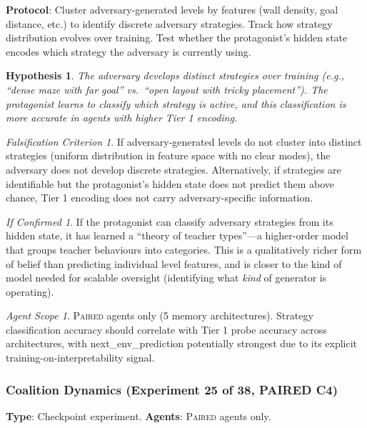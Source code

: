 \documentclass[11pt,a4paper]{article}
\newtheorem{hypothesis}{Hypothesis}[subsection]
\theoremstyle{remark}
\newtheorem*{falsification}{Falsification Criterion}
\newtheorem*{implication}{If Confirmed}
\newtheorem*{agentscope}{Agent Scope}
\newcommand{\paired}{\textsc{Paired}}
\begin{document}
\textbf{Protocol}: Cluster adversary-generated levels by features (wall density, goal distance, etc.) to identify discrete adversary strategies. Track how strategy distribution evolves over training. Test whether the protagonist's hidden state encodes which strategy the adversary is currently using.

\begin{hypothesis}
The adversary develops distinct strategies over training (e.g., ``dense maze with far goal'' vs.\ ``open layout with tricky placement''). The protagonist learns to classify which strategy is active, and this classification is more accurate in agents with higher Tier 1 encoding.
\end{hypothesis}

\begin{falsification}
If adversary-generated levels do not cluster into distinct strategies (uniform distribution in feature space with no clear modes), the adversary does not develop discrete strategies. Alternatively, if strategies are identifiable but the protagonist's hidden state does not predict them above chance, Tier 1 encoding does not carry adversary-specific information.
\end{falsification}

\begin{implication}
If the protagonist can classify adversary strategies from its hidden state, it has learned a ``theory of teacher types''---a higher-order model that groups teacher behaviours into categories. This is a qualitatively richer form of belief than predicting individual level features, and is closer to the kind of model needed for scalable oversight (identifying what \textit{kind} of generator is operating).
\end{implication}

\begin{agentscope}
\paired{} agents only (5 memory architectures). Strategy classification accuracy should correlate with Tier 1 probe accuracy across architectures, with next\_env\_prediction potentially strongest due to its explicit training-on-interpretability signal.
\end{agentscope}

\subsubsection{Coalition Dynamics (Experiment 25 of 38, PAIRED C4)}
\label{exp:coalition_dynamics}

\textbf{Type}: Checkpoint experiment. \textbf{Agents}: \paired{} agents only.
\end{document}
